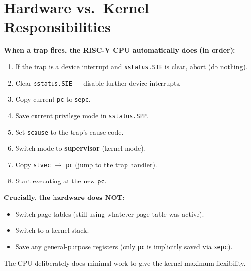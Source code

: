 \documentclass[11pt, a4paper]{article}
\begin{document}
\section{Hardware vs.\ Kernel Responsibilities}

\begin{tcolorbox}[hardware]
\textbf{When a trap fires, the RISC-V CPU automatically does (in order):}
\begin{enumerate}[leftmargin=1.8em, itemsep=0.15em]
  \item If the trap is a device interrupt and \lstinline|sstatus.SIE| is clear, abort (do nothing).
  \item Clear \lstinline|sstatus.SIE| --- disable further device interrupts.
  \item Copy current \lstinline|pc| to \lstinline|sepc|.
  \item Save current privilege mode in \lstinline|sstatus.SPP|.
  \item Set \lstinline|scause| to the trap's cause code.
  \item Switch mode to \textbf{supervisor} (kernel mode).
  \item Copy \lstinline|stvec| $\to$ \lstinline|pc| (jump to the trap handler).
  \item Start executing at the new \lstinline|pc|.
\end{enumerate}

\medskip
\textbf{Crucially, the hardware does NOT:}
\begin{itemize}[leftmargin=1.5em, itemsep=0.1em]
  \item Switch page tables (still using whatever page table was active).
  \item Switch to a kernel stack.
  \item Save any general-purpose registers (only \lstinline|pc| is implicitly saved via \lstinline|sepc|).
\end{itemize}
The CPU deliberately does minimal work to give the kernel maximum flexibility.
\end{tcolorbox}

\vspace{0.8em}
\end{document}
